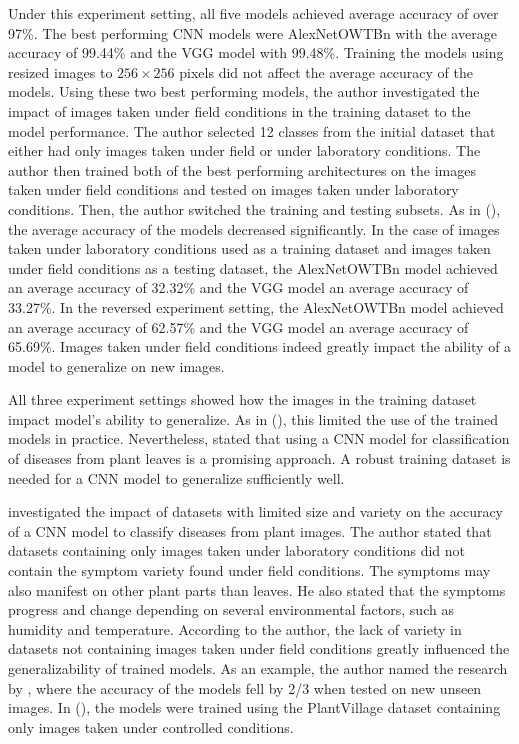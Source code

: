 \documentclass{BachelorBUI}
\begin{document}
        Under this experiment setting, all five models achieved average accuracy of over 97\%. The best performing CNN models were AlexNetOWTBn with the average accuracy of 99.44\% and the VGG model with 99.48\%. Training the models using resized images to $256 \times 256$ pixels did not affect the average accuracy of the models. Using these two best performing models, the author investigated the impact of images taken under field conditions in the training dataset to the model performance. The author selected 12 classes from the initial dataset that either had only images taken under field or under laboratory conditions. The author then trained both of the best performing architectures on the images taken under field conditions and tested on images taken under laboratory conditions. Then, the author switched the training and testing subsets. As in (\cite{Mohanty:2016}), the average accuracy of the models decreased significantly. In the case of images taken under laboratory conditions used as a training dataset and images taken under field conditions as a testing dataset, the AlexNetOWTBn model achieved an average accuracy of 32.32\% and the VGG model an average accuracy of 33.27\%. In the reversed experiment setting, the AlexNetOWTBn model achieved an average accuracy of 62.57\% and the VGG model an average accuracy of 65.69\%. Images taken under field conditions indeed greatly impact the ability of a model to generalize on new images.

        All three experiment settings showed how the images in the training dataset impact model's ability to generalize. As in (\cite{Mohanty:2016}), this limited the use of the trained models in practice. Nevertheless, \textcite{Ferentinos:2018} stated that using a CNN model for classification of diseases from plant leaves is a promising approach. A robust training dataset is needed for a CNN model to generalize sufficiently well.


        \textcite{Barbedo:2018:1} investigated the impact of datasets with limited size and variety on the accuracy of a CNN model to classify diseases from plant images. The author stated that datasets containing only images taken under laboratory conditions did not contain the symptom variety found under field conditions. The symptoms may also manifest on other plant parts than leaves. He also stated that the symptoms progress and change depending on several environmental factors, such as humidity and temperature. According to the author, the lack of variety in datasets not containing images taken under field conditions greatly influenced the generalizability of trained models. As an example, the author named the research by \textcite{Mohanty:2016}, where the accuracy of the models fell by 2/3 when tested on new unseen images. In (\cite{Mohanty:2016}), the models were trained using the PlantVillage dataset containing only images taken under controlled conditions.
\end{document}
